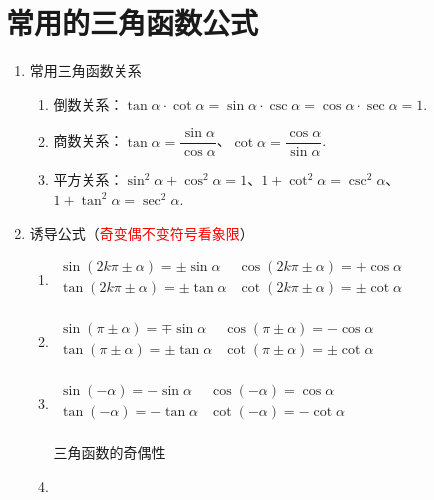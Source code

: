 \chapter{常用的三角函数公式}
\begin{enumerate}
	\item 常用三角函数关系
	\begin{enumerate}
		\item 倒数关系：\( \tan \alpha \cdot \cot \alpha = \sin \alpha \cdot \csc \alpha = \cos \alpha \cdot \sec \alpha = 1 \).
		\\
		\item 商数关系：\( \tan \alpha = \dfrac{\sin \alpha}{\cos \alpha} \)、\( \cot \alpha = \dfrac{\cos\alpha}{\sin\alpha} \).
		\\
		\item 平方关系：\( \sin^{2}\alpha + \cos^{2}\alpha = 1 \)、\( 1 + \cot^{2}\alpha = \csc^{2}\alpha \)、\( 1 + \tan^{2}\alpha = \sec^{2}\alpha \).
	\end{enumerate}
	\item 诱导公式（\textcolor{red}{奇变偶不变符号看象限}）
	\begin{enumerate}
		\item 
		\( \begin{array}{ll}
			\sin(2k\pi \pm \alpha) =\pm \sin \alpha & \cos(2k\pi \pm \alpha) = + \cos \alpha \\
			\tan(2k\pi \pm \alpha) =\pm \tan \alpha & \cot(2k\pi\pm \alpha) = \pm \cot \alpha \\
		\end{array}
		\)
		\item 
		\(
		\begin{array}{ll}
			\sin(\pi \pm \alpha) =  \mp \sin \alpha & \cos(\pi \pm \alpha) = - \cos \alpha \\
			\tan(\pi \pm \alpha) = \pm \tan \alpha & \cot(\pi \pm \alpha) = \pm \cot \alpha \\		
		\end{array}
		\)
		\item
		\(
		\begin{array}{ll}
			\sin(-\alpha) = -\sin\alpha & \cos(-\alpha) = \cos\alpha \\
			\tan(-\alpha) = -\tan\alpha & \cot(-\alpha) = -\cot \alpha \\
		\end{array}
		\)
		\begin{remark}
			三角函数的{\heiti 奇偶性}
		\end{remark}
		\item 

\end{enumerate}
\end{enumerate}

